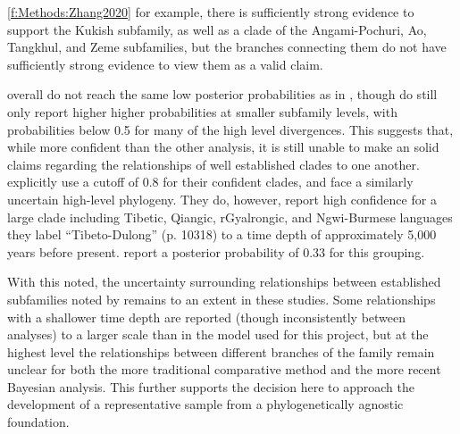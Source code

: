 \ref{f:Methods:Zhang2020} for example, there is sufficiently strong evidence to support the Kukish subfamily, as well as a clade of the Angami-Pochuri, Ao, Tangkhul, and Zeme subfamilies, but the branches connecting them do not have sufficiently strong evidence to view them as a valid claim.

 overall do not reach the same low posterior probabilities as in , though do still only report higher higher probabilities at smaller subfamily levels, with probabilities below 0.5 for many of the high level divergences. This suggests that, while more confident than the other analysis, it is still unable to make an solid claims regarding the relationships of well established clades to one another.  explicitly use a cutoff of 0.8 for their confident clades, and face a similarly uncertain high-level phylogeny. They do, however, report high confidence for a large clade including Tibetic, Qiangic, rGyalrongic, and Ngwi-Burmese languages they label ``Tibeto-Dulong'' (p. 10318) to a time depth of approximately 5,000 years before present.  report a posterior probability of 0.33 for this grouping.

With this noted, the uncertainty surrounding relationships between established subfamilies noted by  remains to an extent in these studies. Some relationships with a shallower time depth are reported (though inconsistently between analyses) to a larger scale than in the model used for this project, but at the highest level the relationships between different branches of the family remain unclear for both the more traditional comparative method and the more recent Bayesian analysis. This further supports the decision here to approach the development of a representative sample from a phylogenetically agnostic foundation.


